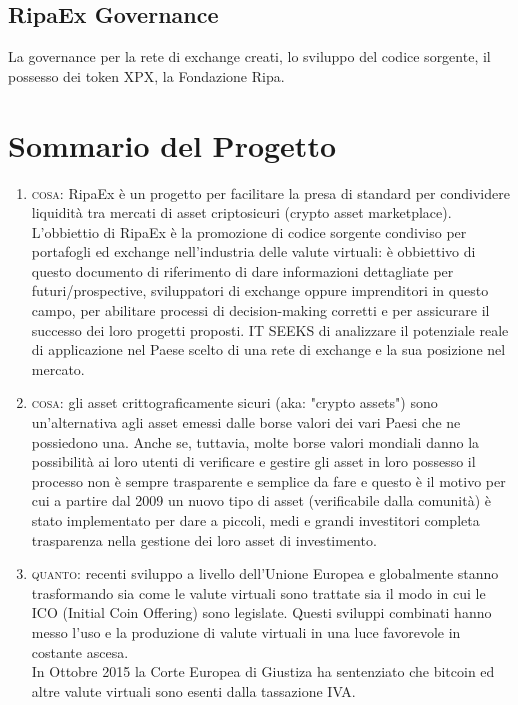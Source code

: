 \documentclass[11pt,fleqn,oneside]{book} %
\begin{document}
\subsection{RipaEx Governance}
La governance per la rete di exchange creati, lo sviluppo del codice sorgente, il possesso dei token XPX, la Fondazione Ripa.

\section{Sommario del Progetto}
\begin{enumerate}
	\item \textsc{cosa}: RipaEx è un progetto per facilitare la presa di standard per condividere liquidità tra mercati di asset
	criptosicuri (crypto asset marketplace).
	L'obbiettio di RipaEx è la promozione di codice sorgente condiviso per portafogli ed exchange nell'industria delle valute
	virtuali: è obbiettivo di questo documento di riferimento di dare informazioni dettagliate per futuri/prospective,
	sviluppatori di exchange oppure imprenditori in questo campo, per abilitare processi di decision-making corretti e per 
	assicurare il successo dei loro progetti proposti.
	IT SEEKS di analizzare il potenziale reale di applicazione nel Paese scelto di una rete di exchange e la sua posizione nel mercato.
	\item \textsc{cosa}: gli asset crittograficamente sicuri (aka: "crypto assets") sono un'alternativa agli asset emessi dalle borse
	valori dei vari Paesi che ne possiedono una. Anche se, tuttavia, molte borse valori mondiali danno la possibilità ai loro 
	utenti di verificare e gestire gli asset in loro possesso il processo non è sempre trasparente e semplice da fare e questo è il motivo 
	per cui a partire dal 2009 \cite{bitcoin} un nuovo tipo di asset (verificabile dalla comunità) è stato implementato
	per dare a piccoli, medi e grandi investitori completa trasparenza nella gestione dei loro asset di investimento.
	\item \textsc{quanto}: recenti sviluppo a livello dell'Unione Europea e globalmente stanno trasformando sia come le valute virtuali
	sono trattate sia il modo in cui le ICO (Initial Coin Offering) sono legislate. Questi sviluppi combinati hanno messo
	l'uso e la produzione di valute virtuali in una luce favorevole in costante ascesa. \\
	In Ottobre 2015 la Corte Europea di Giustiza ha sentenziato che bitcoin ed altre valute virtuali sono esenti dalla tassazione IVA. \\

\end{enumerate}
\end{document}

